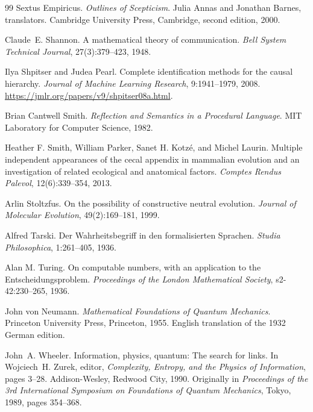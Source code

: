 \documentclass[11pt,a4paper]{article}
\theoremstyle{remark}\newtheorem{remark}[definition]{Remark}
\begin{document}
\begin{thebibliography}{99}
Sextus Empiricus.
\newblock \emph{Outlines of Scepticism}.
\newblock Julia Annas and Jonathan Barnes, translators. Cambridge University Press, Cambridge, second edition, 2000.

Claude~E. Shannon.
\newblock A mathematical theory of communication.
\newblock \emph{Bell System Technical Journal}, 27(3):379--423, 1948.

Ilya Shpitser and Judea Pearl.
\newblock Complete identification methods for the causal hierarchy.
\newblock \emph{Journal of Machine Learning Research}, 9:1941--1979, 2008.
\newblock \url{https://jmlr.org/papers/v9/shpitser08a.html}.

Brian Cantwell Smith.
\newblock \emph{Reflection and Semantics in a Procedural Language}.
\newblock MIT Laboratory for Computer Science, 1982.

Heather F. Smith, William Parker, Sanet H. Kotz\'e, and Michel Laurin.
\newblock Multiple independent appearances of the cecal appendix in mammalian evolution and an investigation of related ecological and anatomical factors.
\newblock \emph{Comptes Rendus Palevol}, 12(6):339--354, 2013.

Arlin Stoltzfus.
\newblock On the possibility of constructive neutral evolution.
\newblock \emph{Journal of Molecular Evolution}, 49(2):169--181, 1999.

Alfred Tarski.
\newblock Der Wahrheitsbegriff in den formalisierten Sprachen.
\newblock \emph{Studia Philosophica}, 1:261--405, 1936.

Alan M. Turing.
\newblock On computable numbers, with an application to the Entscheidungsproblem.
\newblock \emph{Proceedings of the London Mathematical Society}, s2-42:230--265, 1936.

John von Neumann.
\newblock \emph{Mathematical Foundations of Quantum Mechanics}.
\newblock Princeton University Press, Princeton, 1955. English translation of the 1932 German edition.

John~A. Wheeler.
\newblock Information, physics, quantum: The search for links.
\newblock In Wojciech~H. Zurek, editor, \emph{Complexity, Entropy, and the Physics of Information},
pages 3--28. Addison-Wesley, Redwood City, 1990.
\newblock Originally in \emph{Proceedings of the 3rd International Symposium on Foundations of Quantum
Mechanics}, Tokyo, 1989, pages 354--368.


\end{thebibliography}
\end{document}
